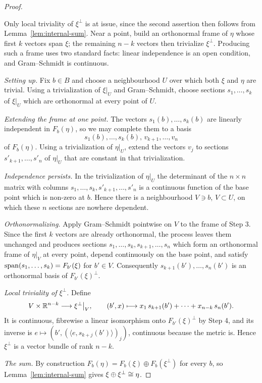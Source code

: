\begin{proof}
\begin{strategy}
Only local triviality of $\xi^\perp$ is at issue, since the second assertion
then follows from Lemma~\ref{lem:internal-sum}. Near a point, build an
orthonormal frame of $\eta$ whose first $k$ vectors span $\xi$; the remaining
$n-k$ vectors then trivialize $\xi^\perp$. Producing such a frame uses two
standard facts: linear independence is an open condition, and Gram--Schmidt is
continuous.
\end{strategy}

 \emph{Setting up.} Fix $b\in B$ and choose a neighbourhood $U$ over
which both $\xi$ and $\eta$ are trivial. Using a trivialization of $\xi|_U$ and
Gram--Schmidt, choose sections $s_1,\dots,s_k$ of $\xi|_U$ which are orthonormal
at every point of $U$.

 \emph{Extending the frame at one point.} The vectors
$s_1(b),\dots,s_k(b)$ are linearly independent in $F_b(\eta)$, so we may complete
them to a basis
\[
s_1(b),\dots,s_k(b),\,v_{k+1},\dots,v_n
\]
of $F_b(\eta)$. Using a trivialization of $\eta|_U$, extend the vectors $v_j$ to
sections $s'_{k+1},\dots,s'_n$ of $\eta|_U$ that are constant in that
trivialization.

 \emph{Independence persists.} In the trivialization of $\eta|_U$ the
determinant of the $n\times n$ matrix with columns
$s_1,\dots,s_k,s'_{k+1},\dots,s'_n$ is a continuous function of the base point
which is non-zero at $b$. Hence there is a neighbourhood $V\ni b$, $V\subset U$,
on which these $n$ sections are nowhere dependent.

 \emph{Orthonormalizing.} Apply Gram--Schmidt pointwise on $V$ to the
frame of Step 3. Since the first $k$ vectors are already orthonormal, the
process leaves them unchanged and produces sections
$s_1,\dots,s_k,s_{k+1},\dots,s_n$ which form an orthonormal frame of $\eta|_V$
at every point, depend continuously on the base point, and satisfy
$\operatorname{span}(s_1,\dots,s_k)=F_{b'}(\xi)$ for $b'\in V$. Consequently
$s_{k+1}(b'),\dots,s_n(b')$ is an orthonormal basis of $F_{b'}(\xi)^\perp$.

 \emph{Local triviality of $\xi^\perp$.} Define
\[
V\times\mathbb{R}^{n-k}\longrightarrow \xi^\perp\big|_V,
\qquad
(b',x)\longmapsto x_1\,s_{k+1}(b')+\dots+x_{n-k}\,s_n(b').
\]
It is continuous, fibrewise a linear isomorphism onto $F_{b'}(\xi)^\perp$ by
Step 4, and its inverse is $e\mapsto(b',(\langle e,s_{k+j}(b')\rangle)_j)$,
continuous because the metric is. Hence $\xi^\perp$ is a vector bundle of rank
$n-k$.

 \emph{The sum.} By construction
$F_b(\eta)=F_b(\xi)\oplus F_b(\xi^\perp)$ for every $b$, so
Lemma~\ref{lem:internal-sum} gives $\xi\oplus\xi^\perp\cong\eta$.
\end{proof}

